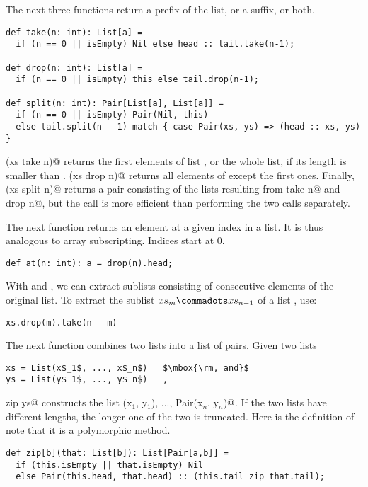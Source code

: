 \documentclass[11pt]{book}
\begin{document}
The next three functions return a prefix of the list, or a suffix, or
both.
\begin{verbatim}
def take(n: int): List[a] = 
  if (n == 0 || isEmpty) Nil else head :: tail.take(n-1);

def drop(n: int): List[a] = 
  if (n == 0 || isEmpty) this else tail.drop(n-1);

def split(n: int): Pair[List[a], List[a]] = 
  if (n == 0 || isEmpty) Pair(Nil, this)
  else tail.split(n - 1) match { case Pair(xs, ys) => (head :: xs, ys) }
\end{verbatim}
\verb@(xs take n)@ returns the first \verb@n@ elements of list
\verb@xs@, or the whole list, if its length is smaller than \verb@n@.
\verb@(xs drop n)@ returns all elements of \verb@xs@ except the
\verb@n@ first ones. Finally, \verb@(xs split n)@ returns a pair
consisting of the lists resulting from \verb@xs take n@ and
\verb@xs drop n@, but the call is more efficient than performing the
two calls separately. 

The next function returns an element at a given index in a list.
It is thus analogous to array subscripting. Indices start at 0.
\begin{verbatim}   
def at(n: int): a = drop(n).head;
\end{verbatim}

With \verb@take@ and \verb@drop@, we can extract sublists consisting
of consecutive elements of the original list.  To extract the sublist
$xs_m \commadots xs_{n-1}$ of a list \verb@xs@, use:

\begin{verbatim}
xs.drop(m).take(n - m)
\end{verbatim}

The next function combines two lists into a list of pairs.
Given two lists 
\begin{verbatim}
xs = List(x$_1$, ..., x$_n$)   $\mbox{\rm, and}$
ys = List(y$_1$, ..., y$_n$)   ,
\end{verbatim}
\verb@xs zip ys@ constructs the list \verb@Pair(x$_1$, y$_1$), ..., Pair(x$_n$, y$_n$)@.
If the two lists have different lengths, the longer one of the two is
truncated. Here is the definition of \verb@zip@ -- note that it is a
polymorphic method.
\begin{verbatim}
def zip[b](that: List[b]): List[Pair[a,b]] = 
  if (this.isEmpty || that.isEmpty) Nil
  else Pair(this.head, that.head) :: (this.tail zip that.tail);
\end{verbatim}
\end{document}
